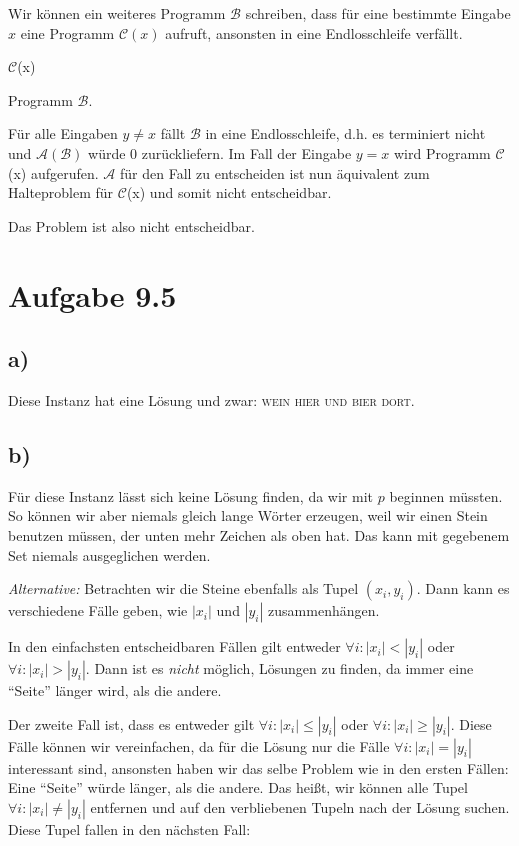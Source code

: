 \documentclass{article}
\begin{document}
Wir können ein weiteres Programm $\mathcal{B}$ schreiben, dass für eine bestimmte Eingabe $x$ eine Programm $\mathcal{C}(x)$ aufruft, ansonsten in eine Endlosschleife verfällt.

\begin{algorithm}
$\mathcal{C}$(x)\;
\caption{Programm $\mathcal{B}$.}
\end{algorithm}

Für alle Eingaben $y\neq x$ fällt $\mathcal{B}$ in eine Endlosschleife, d.h. es terminiert nicht und $\mathcal{A(B)}$ würde 0 zurückliefern. Im Fall der Eingabe $y=x$ wird Programm $\mathcal{C}$(x) aufgerufen. $\mathcal{A}$ für den Fall zu entscheiden ist nun äquivalent zum Halteproblem für $\mathcal{C}$(x) und somit nicht entscheidbar. 

Das Problem ist also nicht entscheidbar.



\section*{Aufgabe 9.5}
\subsection*{a)}
Diese Instanz hat eine Lösung und zwar: \textsc{wein hier und bier dort}.

\subsection*{b)}
Für diese Instanz lässt sich keine Lösung finden, da wir mit $p$ beginnen müssten. So können wir aber niemals gleich lange Wörter erzeugen, weil wir einen Stein benutzen müssen, der unten mehr Zeichen als oben hat. Das kann mit gegebenem Set niemals ausgeglichen werden.

\bigskip

\emph{Alternative:} Betrachten wir die Steine ebenfalls als Tupel $(x_i,y_i)$. Dann kann es verschiedene Fälle geben, wie $|x_i|$ und $|y_i|$ zusammenhängen.

In den einfachsten entscheidbaren Fällen gilt entweder $\forall i: |x_i| < |y_i|$ oder $\forall i: |x_i| > |y_i|$. Dann ist es \emph{nicht} möglich, Lösungen zu finden, da immer eine "`Seite"' länger wird, als die andere.

Der zweite Fall ist, dass es entweder gilt $\forall i: |x_i| \leq |y_i|$ oder $\forall i: |x_i| \geq |y_i|$. Diese Fälle können wir vereinfachen, da für die Lösung nur die Fälle $\forall i: |x_i| = |y_i|$ interessant sind, ansonsten haben wir das selbe Problem wie in den ersten Fällen: Eine "`Seite"' würde länger, als die andere. Das heißt, wir können alle Tupel $\forall i: |x_i| \neq |y_i|$ entfernen und auf den verbliebenen Tupeln nach der Lösung suchen. Diese Tupel fallen in den nächsten Fall:
\end{document}
